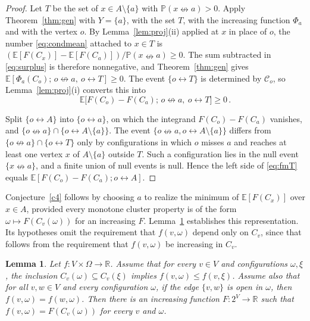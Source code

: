 \documentclass[11pt]{article}
\newtheorem{lemma}[theorem]{Lemma}
\theoremstyle{definition}
\theoremstyle{remark}
\newcommand{\PP}{\mathbb P}
\newcommand{\EE}{\mathbb E}
\newcommand{\con}{\leftrightarrow}
\newcommand{\ncon}{\nleftrightarrow}
\newcommand{\eC}{\mathcal C}
\begin{document}
\begin{proof}
Let $T$ be the set of $x\in A\setminus\{a\}$ with $\PP(x\ncon a)>0$. Apply
Theorem~\ref{thm:gen} with $Y=\{a\}$, with the set $T$, with the increasing function
$\Phi_a$ and with the vertex $o$. By Lemma~\ref{lem:proj}(ii) applied at $x$ in place of
$o$, the number \eqref{eq:condmean} attached to $x\in T$ is
$(\EE[F(C_x)]-\EE[F(C_a)])/\PP(x\ncon a)\ge0$. The sum subtracted in \eqref{eq:surplus} is
therefore nonnegative, and Theorem~\ref{thm:gen} gives
$\EE[\Phi_a(C_o);\,o\ncon a,\ o\con T]\ge0$. The event $\{o\con T\}$ is determined by
$\eC_o$, so Lemma~\ref{lem:proj}(i) converts this into
\begin{equation}\label{eq:fmT}
 \EE\bigl[F(C_o)-F(C_a);\,o\ncon a,\ o\con T\bigr]\geq 0\,.
\end{equation}

Split $\{o\con A\}$ into $\{o\con a\}$, on which the integrand $F(C_o)-F(C_a)$ vanishes,
and $\{o\ncon a\}\cap\{o\con A\setminus\{a\}\}$. The event
$\{o\ncon a,o\con A\setminus\{a\}\}$ differs from $\{o\ncon
a\}\cap\{o\con T\}$ only by configurations in which $o$ misses $a$ and reaches at least one
vertex $x$ of $A\setminus\{a\}$ outside $T$. Such a configuration lies in the null event
$\{x\ncon a\}$, and a finite union of null events is null. Hence the left side of
\eqref{eq:fmT} equals $\EE[F(C_o)-F(C_a);o\con A]$.
\end{proof}

Conjecture~\ref{c4} follows by choosing $a$ to realize the minimum of $\EE[F(C_x)]$ over
$x\in A$, provided every monotone cluster property is of the form $\omega\mapsto
F(C_v(\omega))$ for an increasing $F$. Lemma~\ref{lem:clusterprop} establishes this
representation. Its hypotheses omit the
requirement that $f(v,\omega)$ depend only on $C_v$, since that follows from the
requirement that $f(v,\omega)$ be increasing in $C_v$.

\begin{lemma}\label{lem:clusterprop}
Let $f:V\times\Omega\to\mathbb R$. Assume that for every $v\in V$ and configurations
$\omega,\xi$, the inclusion $C_v(\omega)\subseteq C_v(\xi)$ implies
$f(v,\omega)\leq f(v,\xi)$. Assume also that for all $v,w\in V$ and every configuration
$\omega$, if the edge $\{v,w\}$ is open in $\omega$, then $f(v,\omega)=f(w,\omega)$.
Then there is an increasing function $F:2^V\to\mathbb R$ such that
$f(v,\omega)=F(C_v(\omega))$ for every $v$ and $\omega$.
\end{lemma}
\end{document}
